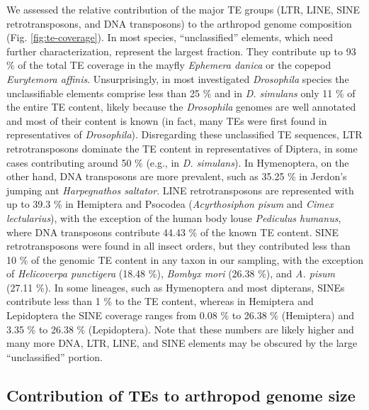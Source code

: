 We assessed the relative contribution of the major TE groups (LTR, LINE,
SINE retrotransposons, and DNA transposons) to the arthropod genome
composition (Fig. \ref{fig:te-coverage}). In most species,
``unclassified'' elements, which need further characterization,
represent the largest fraction. They contribute up to 93 \% of the total
TE coverage in the mayfly \emph{Ephemera danica} or the copepod
\emph{Eurytemora affinis}.  Unsurprisingly, in most investigated
\emph{Drosophila} species the unclassifiable elements comprise less than
25 \% and in \emph{D.  simulans} only 11 \% of the entire TE content,
likely because the \emph{Drosophila} genomes are well annotated and most
of their content is known (in fact, many TEs were first found in
representatives of \emph{Drosophila}). Disregarding these unclassified
TE sequences, LTR retrotransposons dominate the TE content in
representatives of Diptera, in some cases contributing around 50 \%
(e.g., in \emph{D. simulans}).  In Hymenoptera, on the other hand, DNA
transposons are more prevalent, such as 35.25 \% in Jerdon's jumping ant
\emph{Harpegnathos saltator}.  LINE retrotransposons are represented
with up to 39.3 \% in Hemiptera and Psocodea (\emph{Acyrthosiphon pisum}
and \emph{Cimex lectularius}), with the exception of the human body
louse \emph{Pediculus humanus}, where DNA transposons contribute 44.43
\% of the known TE content. SINE retrotransposons were found in all
insect orders, but they contributed less than 10 \% of the genomic TE
content in any taxon in our sampling, with the exception of
\emph{Helicoverpa punctigera} (18.48 \%), \emph{Bombyx mori} (26.38 \%),
and \emph{A. pisum} (27.11 \%). In some lineages, such as Hymenoptera
and most dipterans, SINEs contribute less than 1 \% to the TE content,
whereas in Hemiptera and Lepidoptera the SINE coverage ranges from 0.08
\% to 26.38 \% (Hemiptera) and 3.35 \% to 26.38 \% (Lepidoptera). Note
that these numbers are likely higher and many more DNA, LTR, LINE, and
SINE elements may be obscured by the large ``unclassified'' portion.

\subsection{Contribution of TEs to arthropod genome size}

